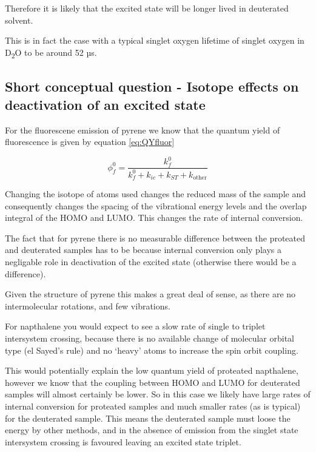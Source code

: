 \documentclass[
]{book}
\begin{document}
Therefore it is likely that the excited state will be longer lived in deuterated solvent.

This is in fact the case with a typical singlet oxygen lifetime of singlet oxygen in D\textsubscript{2}O to be around 52 µs.

\hypertarget{sec:isotopeans}{%
\subsection{Short conceptual question - Isotope effects on deactivation of an excited state}\label{sec:isotopeans}}

For the fluorescene emission of pyrene we know that the quantum yield of fluorescence is given by equation \eqref{eq:QYfluor}

\begin{equation}
\phi_{f}^0 = \frac{k_{f}^0}{k_f^0+k_{ic}+ k_{ST}+k_{\textrm{other}}}
\label{eq:QYfluor}
\end{equation}

Changing the isotope of atoms used changes the reduced mass of the sample and consequently changes the spacing of the vibrational energy levels and the overlap integral of the HOMO and LUMO. This changes the rate of internal conversion.

The fact that for pyrene there is no measurable difference between the proteated and deuterated samples has to be because internal conversion only plays a negligable role in deactivation of the excited state (otherwise there would be a difference).

Given the structure of pyrene this makes a great deal of sense, as there are no intermolecular rotations, and few vibrations.

For napthalene you would expect to see a slow rate of single to triplet intersystem crossing, because there is no available change of molecular orbital type (el Sayed's rule) and no `heavy' atoms to increase the spin orbit coupling.

This would potentially explain the low quantum yield of proteated napthalene, however we know that the coupling between HOMO and LUMO for deuterated samples will almost certainly be lower. So in this case we likely have large rates of internal conversion for proteated samples and much smaller rates (as is typical) for the deuterated sample. This means the deuterated sample must loose the energy by other methods, and in the absence of emission from the singlet state intersystem crossing is favoured leaving an excited state triplet.
\end{document}
